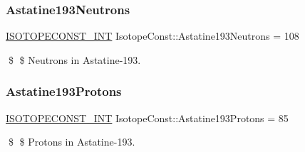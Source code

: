 \subsubsection{\texorpdfstring{Astatine193\+Neutrons}{Astatine193Neutrons}}
{\footnotesize\ttfamily \mbox{\hyperlink{group___isotope_const-_macros_ga5f18360b3e99483a35c32d789e62621c}{I\+S\+O\+T\+O\+P\+E\+C\+O\+N\+S\+T\+\_\+\+I\+NT}} Isotope\+Const\+::\+Astatine193\+Neutrons = 108}

\$ \$ Neutrons in Astatine-\/193. \mbox{\label{group___isotope_const-_astatine-_at193_ga3ff3f461960c59fb98dbad8bbe536e5b}} 
\subsubsection{\texorpdfstring{Astatine193\+Protons}{Astatine193Protons}}
{\footnotesize\ttfamily \mbox{\hyperlink{group___isotope_const-_macros_ga5f18360b3e99483a35c32d789e62621c}{I\+S\+O\+T\+O\+P\+E\+C\+O\+N\+S\+T\+\_\+\+I\+NT}} Isotope\+Const\+::\+Astatine193\+Protons = 85}

\$ \$ Protons in Astatine-\/193. 